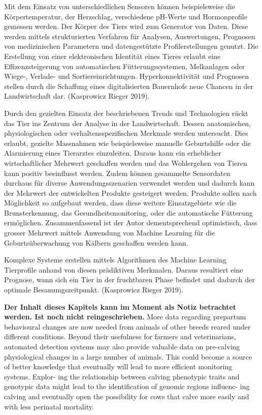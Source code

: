 Mit dem Einsatz von unterschiedlichen Sensoren können beispielsweise die Körpertemperatur,
der Herzschlag, verschiedene pH-Werte und Hormonprofile gemessen
werden. Der Körper des Tiers wird zum Generator von Daten. Diese werden mittels
strukturierten Verfahren für Analysen, Auswertungen, Prognosen von medizinischen
Parametern und datengestützte Profilerstellungen genutzt. 
Die Erstellung von einer elektronischen Identität eines Tieres erlaubt eine Effizenzsteigerung von
automatischen Fütterungssystemen, Melkanlagen oder Wiege-, Verlade- und Sortiereinrichtungen.
Hyperkonnektivität und Prognosen stellen durch die Schaffung eines
digitalisierten Bauernhofs neue Chancen in der Landwirtschaft dar. (Kasprowicz 
Rieger 2019).


Durch den gezielten Einsatz der beschriebenen Trends und Technologien rückt
das Tier ins Zentrum der Analyse in der Landwirtschaft. Dessen anatomischen,
physiologischen oder verhaltensspezifischen Merkmale werden untersucht. Dies
erlaubt, gezielte Massnahmen wie beispielsweise manuelle Geburtshilfe oder die
Alarmierung eines Tierarztes einzuleiten. Daraus kann ein erheblicher wirtschaftlicher
Mehrwert geschaffen werden und das Wohlergehen von Tieren kann positiv
beeinflusst werden.
Zudem können gesammelte Sensordaten durchaus für diverse Anwendungsszenarien
verwendet werden und dadurch kann der Mehrwert der entwickelten Produkte
gesteigert werden. Produkte sollen nach Möglichkeit so aufgebaut werden, dass
diese weitere Einsatzgebiete wie die Brunsterkennung, das Gesundheitsmonitoring,
oder die automatische Fütterung ermöglichen.
Zusammenfassend ist der Autor dementsprechend optimistisch, dass grosser Mehrwert
mittels Anwendung von Machine Learning für die Geburtsüberwachung von
Kälbern geschaffen werden kann.

Komplexe Systeme erstellen mittels Algorithmen
des Machine Learning Tierprofile anhand von diesen prädiktiven Merkmalen. Daraus
resultiert eine Prognose, wann sich ein Tier in der fruchtbaren Phase befindet
und dadurch der optimale Besamungszeitpunkt. (Kasprowicz  Rieger 2019).



\textbf{Der Inhalt dieses Kapitels kann im Moment als Notiz betrachtet werden. Ist noch nicht reingeschrieben.} \newline
More data regarding prepartum behavioural changes are now needed from animals of other breeds reared under different conditions. Beyond their usefulness for farmers and veterinarians, automated detection systems may also provide valuable data on pre-calving physiological changes in a large number of animals. This could become a source of better knowledge that eventually will lead to more efficient monitoring systems. Explor- ing the relationship between calving phenotypic traits and genotypic data might lead to the identification of genomic regions influenc- ing calving and eventually open the possibility for cows that calve more easily and with less perinatal mortality. \cite{Saint-Dizier2015}

